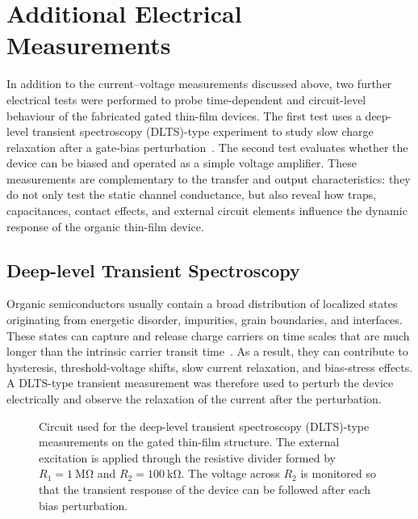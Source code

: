 \section{Additional Electrical Measurements}

In addition to the current--voltage measurements discussed above, two further electrical tests were performed to probe time-dependent and circuit-level behaviour of the fabricated gated thin-film devices. The first test uses a deep-level transient spectroscopy (DLTS)-type experiment to study slow charge relaxation after a gate-bias perturbation~\cite{Lang1974DLTS,Hirwa2015TrapStates}. The second test evaluates whether the device can be biased and operated as a simple voltage amplifier. These measurements are complementary to the transfer and output characteristics: they do not only test the static channel conductance, but also reveal how traps, capacitances, contact effects, and external circuit elements influence the dynamic response of the organic thin-film device.

\subsection{Deep-level Transient Spectroscopy}



Organic semiconductors usually contain a broad distribution of localized states originating from energetic disorder, impurities, grain boundaries, and interfaces. These states can capture and release charge carriers on time scales that are much longer than the intrinsic carrier transit time~\cite{Hirwa2015TrapStates,Bobbert2012OperationalStability}. As a result, they can contribute to hysteresis, threshold-voltage shifts, slow current relaxation, and bias-stress effects. A DLTS-type transient measurement was therefore used to perturb the device electrically and observe the relaxation of the current after the perturbation.

\begin{figure}[htbp]
\centering
\resizebox{0.55\textwidth}{!}{}
\caption[Deep-level transient spectroscopy circuit]{Circuit used for the deep-level transient spectroscopy (DLTS)-type measurements on the gated thin-film structure. The external excitation is applied through the resistive divider formed by $R_1=\SI{1}{\mega\ohm}$ and $R_2=\SI{100}{\kilo\ohm}$. The voltage across $R_2$ is monitored so that the transient response of the device can be followed after each bias perturbation.}
\label{fig:dlts_measurement_circuit}
\end{figure}


